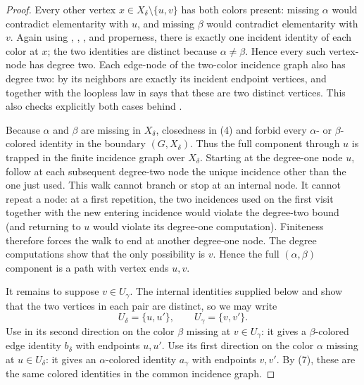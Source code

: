 \begin{proof}
Every other vertex $x\in X_\delta\setminus\{u,v\}$ has both colors
present: missing $\alpha$ would contradict elementarity with $u$, and
missing $\beta$ would contradict elementarity with $v$.  Again using
, ,
, and properness, there is exactly one incident
identity of each color at $x$; the two identities are distinct because
$\alpha\ne\beta$.  Hence every such vertex-node has degree two.  Each
edge-node of the two-color incidence graph also has degree two: by
 its neighbors are exactly its incident
endpoint vertices, and  together with the loopless law
in  says that these are two distinct vertices.
This also checks explicitly both cases behind
.

Because $\alpha$ and $\beta$ are missing in $X_\delta$, closedness in (4)
and  forbid every
$\alpha$- or $\beta$-colored identity in the boundary
$(G,X_\delta)$.  Thus the full component through
$u$ is trapped in the finite incidence graph over $X_\delta$.  Starting
at the degree-one node $u$, follow at each subsequent degree-two node the
unique incidence other than the one just used.  This walk cannot branch or
stop at an internal node.  It cannot repeat a node: at a first repetition,
the two incidences used on the first visit together with the new entering
incidence would violate the degree-two bound (and returning to $u$ would
violate its degree-one computation).  Finiteness therefore forces the walk
to end at another degree-one node.  The degree computations show that the
only possibility is $v$.  Hence the full $(\alpha,\beta)$ component is a
path with vertex ends $u,v$.

It remains to suppose $v\in U_\gamma$.  The internal identities supplied
below and  show that the two vertices in each
pair are distinct, so we may write
\[
 U_\delta=\{u,u'\},\qquad U_\gamma=\{v,v'\}.
\]
Use  in its second direction on
the color $\beta$ missing at $v\in U_\gamma$: it gives a
$\beta$-colored edge identity $b_\delta$ with endpoints $u,u'$.  Use its
first direction on the color $\alpha$ missing at $u\in U_\delta$: it gives
an $\alpha$-colored identity $a_\gamma$ with endpoints $v,v'$.  By (7),
these are the same colored identities in the common incidence graph.


\end{proof}
